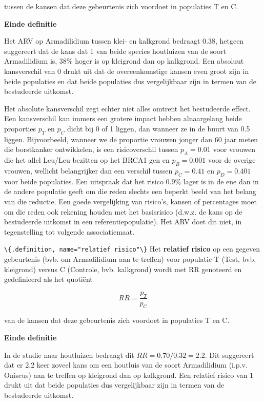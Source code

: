 \documentclass[
  12pt,dutch,coursenotes]{book}
\newcommand{\passthrough}[1]{#1}
\begin{document}
tussen de kansen dat deze gebeurtenis zich voordoet in populaties T en C.

\textbf{Einde definitie}

Het ARV op Armadilidium tussen klei- en kalkgrond bedraagt 0.38, hetgeen suggereert dat de kans dat 1 van beide species houtluizen van de soort Armadilidium is, 38\% hoger is op kleigrond dan op kalkgrond. Een absoluut kansverschil
van 0 drukt uit dat de overeenkomstige kansen even groot zijn in beide
populaties en dat beide populaties dus vergelijkbaar zijn in termen van de bestudeerde uitkomst.

Het absolute kansverschil zegt echter niet alles omtrent het
bestudeerde effect. Een kansverschil kan immers een grotere impact hebben
alnaargelang beide proporties \(p_T\) en \(p_C\) dicht bij 0 of 1 liggen, dan
wanneer ze in de buurt van 0.5 liggen.
Bijvoorbeeld, wanneer we de proportie
vrouwen jonger dan 60 jaar meten die borstkanker ontwikkelen, is
een risicoverschil tussen \(p_A=0.01\) voor vrouwen die het allel Leu/Leu bezitten op het BRCA1 gen
en \(p_B=0.001\) voor de overige vrouwen, wellicht belangrijker dan een verschil tussen \(p_C=0.41\) en \(p_D=0.401\) voor beide populaties. Een uitspraak dat het risico 0.9\% lager is in de ene dan in de andere populatie geeft om die reden slechts een beperkt beeld van het belang van die reductie. Een goede vergelijking van risico's, kansen of percentages moet om die reden ook rekening houden met het basisrisico (d.w.z. de kans op de bestudeerde uitkomst in een referentiepopulatie). Het ARV doet dit niet, in tegenstelling tot volgende associatiemaat.

\passthrough{\lstinline!\{.definition, name="relatief risico"\}!}
Het \textbf{relatief risico} op een gegeven gebeurtenis (bvb. om Armadilidium aan te treffen) voor populatie T (Test, bvb. kleigrond) versus C (Controle, bvb. kalkgrond) wordt met RR
genoteerd en gedefinieerd als het quotiënt

\begin{equation*}
RR=\frac{p_T}{p_C}
\end{equation*}

van de kansen dat deze gebeurtenis zich voordoet in populaties T en C.

\textbf{Einde definitie}

In de studie naar houtluizen bedraagt dit \(RR=0.70/0.32=2.2\). Dit
suggereert dat er 2.2 keer zoveel kans om een houtluis van de soort Armadilidium (i.p.v. Oniscus) aan te treffen op kleigrond dan op kalkgrond. Een
relatief risico van 1 drukt uit dat beide populaties dus vergelijkbaar zijn in termen van de bestudeerde uitkomst.
\end{document}
